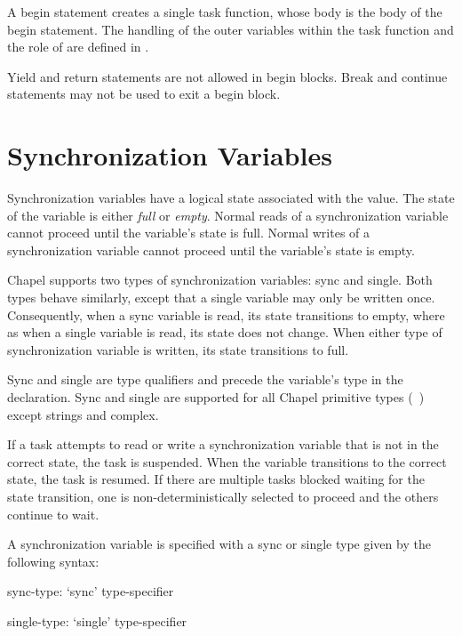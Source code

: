 A begin statement creates a single task function,
whose body is the body of the begin statement.
The handling of the outer variables within the task function and
the role of  are defined in .

Yield and return statements are not allowed in begin blocks.  Break
and continue statements may not be used to exit a begin block.

%
%

\section{Synchronization Variables}
\label{Synchronization_Variables}

Synchronization variables have a logical state associated with the
value.  The state of the variable is either {\em full} or {\em empty}.
Normal reads of a synchronization variable cannot proceed until the
variable's state is full.  Normal writes of a synchronization variable
cannot proceed until the variable's state is empty.

Chapel supports two types of synchronization variables: sync and
single.  Both types behave similarly, except that a single variable
may only be written once.  Consequently, when a sync variable is read,
its state transitions to empty, where as when a single variable is
read, its state does not change.  When either type of synchronization
variable is written, its state transitions to full.

Sync and single are type qualifiers and precede the variable's type in
the declaration.  Sync and single are supported for all Chapel
primitive types (~) except strings and complex.

If a task attempts to read or write a synchronization variable that is
not in the correct state, the task is suspended.  When the variable
transitions to the correct state, the task is resumed.  If there are
multiple tasks blocked waiting for the state transition, one is
non-deterministically selected to proceed and the others continue to
wait.

A synchronization variable is specified with a sync or single type
given by the following syntax:
\begin{syntax}
sync-type:
  `sync' type-specifier

single-type:
  `single' type-specifier
\end{syntax}

